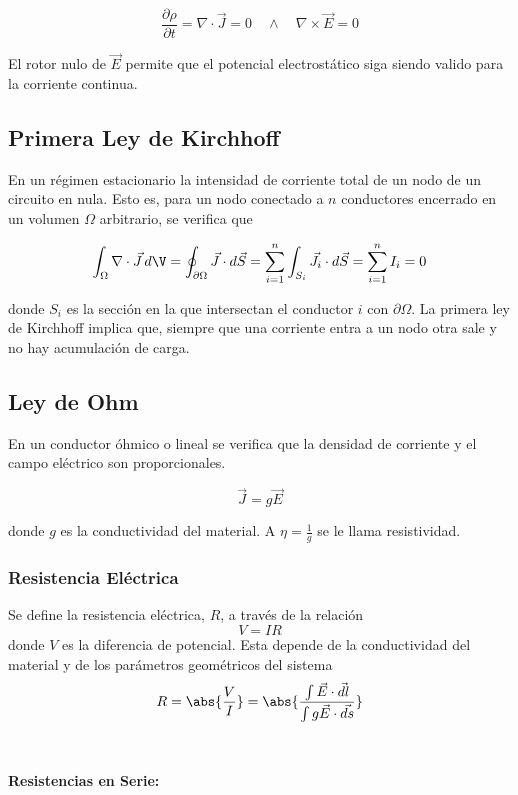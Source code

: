 \[\frac{\partial\rho}{\partial t}=\nabla\cdot\Vec{J}=0 \quad \wedge \quad \nabla\times\Vec{E}=0\]

El rotor nulo de $\Vec{E}$ permite que el potencial electrostático siga siendo valido para la corriente continua.

\subsection{Primera Ley de Kirchhoff}

En un régimen estacionario la intensidad de corriente total de un nodo de un circuito en nula. Esto es, para un nodo conectado a $n$ conductores encerrado en un volumen $\Omega$ arbitrario, se verifica que

\[\int_\Omega\nabla\cdot\Vec{J}\,d\V=\oint_{\partial \Omega}
\Vec{J}\cdot d\Vec{S}=\sum_{i=1}^n\int_{S_i}
\Vec{J}_i\cdot d\Vec{S}=\sum_{i=1}^n I_i = 0\]

donde $S_i$ es la sección en la que intersectan el conductor $i$ con $\partial\Omega$. La primera ley de Kirchhoff implica que, siempre que una corriente entra a un nodo otra sale y no hay acumulación de carga.

\subsection{Ley de Ohm}

En un conductor óhmico o lineal se verifica que la densidad de corriente y el campo eléctrico son proporcionales.

\[\Vec{J} = g\Vec{E}\]

donde $g$ es la conductividad del material. A $\eta=\frac{1}{g}$ se le llama resistividad.\\

\subsubsection{Resistencia Eléctrica}

Se define la resistencia eléctrica, $R$, a través de la relación
\[V = IR\]
donde $V$ es la diferencia de potencial. Esta depende de la conductividad del material y de los parámetros geométricos del sistema
\[R = \abs{\frac{V}{I}} = \abs{\frac{\int \Vec{E}\cdot\Vec{dl}}{\int g\Vec{E}\cdot \Vec{ds}}}\]\\
\hfill \\
\textbf{Resistencias en Serie:}

